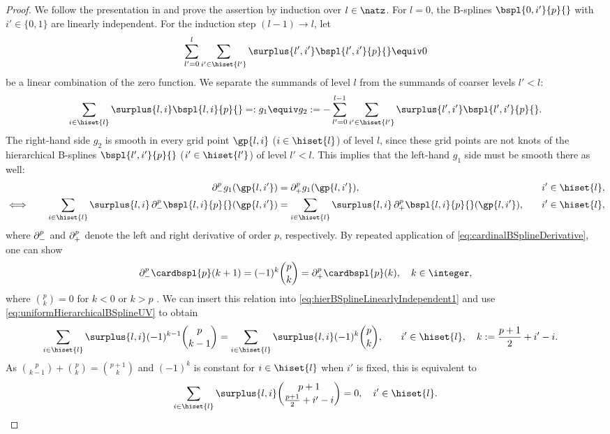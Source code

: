 \begin{proof}
  We follow the presentation in \cite{Valentin16Hierarchical} and
  prove the assertion by induction over $l \in \natz$.
  For $l = 0$, the B-splines $\bspl{0,i'}{p}{}$ with $i' \in \{0, 1\}$
  are linearly independent.
  For the induction step $(l-1) \to l$, let
  \begin{equation}
    \sum_{l'=0}^l \sum_{i' \in \hiset{l'}} \surplus{l',i'} \bspl{l',i'}{p}{}
    \equiv 0
  \end{equation}
  be a linear combination of the zero function.
  We separate the summands of level $l$
  from the summands of coarser levels $l' < l$:
  \begin{equation}
    \label{eq:hierBSplineLinearlyIndependent3}
    \sum_{i \in \hiset{l}} \surplus{l,i} \bspl{l,i}{p}{}
    =: g_1 \equiv g_2 :=
    -\sum_{l'=0}^{l-1} \sum_{i' \in \hiset{l'}} \surplus{l',i'} \bspl{l',i'}{p}{}.
  \end{equation}
  The right-hand side $g_2$ is smooth in every grid point
  $\gp{l,i}$ ($i \in \hiset{l}$) of level $l$,
  since these grid points are not knots of the hierarchical B-splines
  $\bspl{l',i'}{p}{}$ ($i' \in \hiset{l'}$) of level $l' < l$.
  This implies that the left-hand $g_1$ side must be smooth there as well:
  \begin{alignat}{3}
    &&
    \partialdiff_-^p g_1(\gp{l,i'})
    &= \partialdiff_+^p g_1(\gp{l,i'}),\quad
    &&i' \in \hiset{l},\\
    \label{eq:hierBSplineLinearlyIndependent1}
    \iff\quad&&
    \sum_{i \in \hiset{l}} \surplus{l,i}
    \partialdiff_-^p \bspl{l,i}{p}{}(\gp{l,i'})
    &= \sum_{i \in \hiset{l}} \surplus{l,i}
    \partialdiff_+^p \bspl{l,i}{p}{}(\gp{l,i'}),\quad
    &&i' \in \hiset{l},
  \end{alignat}
  where $\mathop{}\!\partial_-^p$ and $\mathop{}\!\partial_+^p$ denote the left and right
  derivative of order $p$, respectively.
  By repeated application of \eqref{eq:cardinalBSplineDerivative},
  one can show
  \begin{equation}
    \partialdiff_-^p \cardbspl{p}(k + 1)
    = (-1)^k \binom{p}{k}
    = \partialdiff_+^p \cardbspl{p}(k),\quad
    k \in \integer,
  \end{equation}
  where $\binom{p}{k} = 0$ for $k < 0$ or $k > p$
  \cite{Hoellig13Approximation}.
  We can insert this relation into
  \eqref{eq:hierBSplineLinearlyIndependent1}
  and use \eqref{eq:uniformHierarchicalBSplineUV} to obtain
  \begin{alignat}{2}
    \sum_{i \in \hiset{l}} \surplus{l,i} (-1)^{k-1} \binom{p}{k-1}
    &= \sum_{i \in \hiset{l}} \surplus{l,i} (-1)^k \binom{p}{k},\quad
    &&i' \in \hiset{l},\quad
    k := \frac{p+1}{2} + i' - i.
  \end{alignat}
  As $\binom{p}{k-1} + \binom{p}{k} = \binom{p+1}{k}$
  and $(-1)^k$ is constant for $i \in \hiset{l}$ when $i'$ is fixed,
  this is equivalent to
  \begin{equation}
    \label{eq:hierBSplineLinearlyIndependent2}
    \sum_{i \in \hiset{l}} \surplus{l,i}
    \binom{p+1}{\frac{p+1}{2} + i' - i} = 0,\quad
    i' \in \hiset{l}.
  \end{equation}
  

\end{proof}
